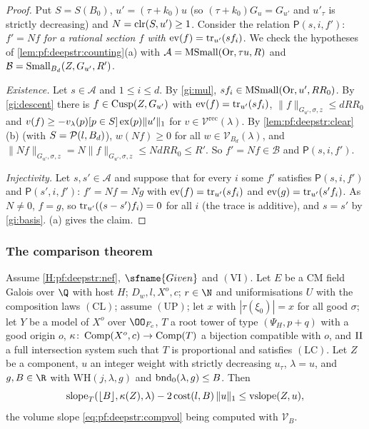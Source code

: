 \begin{proof}
Put $S=S(B_0)$, $u'=(\tau+k_0)u$ (so $(\tau+k_0)G_u=G_{u'}$ and $u'_\tau$ is strictly decreasing) and
$N=\operatorname{clr}(S,u')\ge1$. Consider the relation $\mathsf P(s,i,f')$: \emph{$f'=Nf$ for a rational section
$f$ with $\operatorname{ev}(f)=\operatorname{tr}_{u'}(sf_i)$}. We check the hypotheses of \cref{lem:pf:deepstr:counting}(a)
with $\mathcal A=\operatorname{MSmall}(\mathrm{Or},\tau u,R)$ and $\mathcal B=\operatorname{Small}_{B_d}(Z,G_{u'},R')$.

\emph{Existence.} Let $s\in\mathcal A$ and $1\le i\le d$. By \ref{gi:mul}, $sf_i\in\operatorname{MSmall}(\mathrm{Or},u',RR_0)$. By
\ref{gi:descent} there is $f\in\operatorname{Cusp}(Z,G_{u'})$ with $\operatorname{ev}(f)=\operatorname{tr}_{u'}(sf_i)$,
$\|f\|_{G_{u'},\sigma,z}\le dRR_0$ and $v(f)\ge-v_\lambda(p)[p\in S]\operatorname{ex}(p)\|u'\|_1$ for $v\in\mathcal
V^{\mathrm{rec}}(\lambda)$. By \cref{lem:pf:deepstr:clear}(b) (with $S=\mathcal{P}(l,B_d)$), $w(Nf)\ge0$ for all
$w\in\mathcal V_{B_d}(\lambda)$, and $\|Nf\|_{G_{u'},\sigma,z}=N\|f\|_{G_{u'},\sigma,z}\le NdRR_0\le R'$. So
$f'=Nf\in\mathcal B$ and $\mathsf P(s,i,f')$.

\emph{Injectivity.} Let $s,s'\in\mathcal A$ and suppose that for every $i$ some $f'$ satisfies $\mathsf P(s,i,f')$
and $\mathsf P(s',i,f')$: $f'=Nf=Ng$ with $\operatorname{ev}(f)=\operatorname{tr}_{u'}(sf_i)$ and $\operatorname{ev}(g)=\operatorname{tr}_{u'}(s'f_i)$.
As $N\ne0$, $f=g$, so $\operatorname{tr}_{u'}((s-s')f_i)=0$ for all $i$ (the trace is additive), and $s=s'$ by
\ref{gi:basis}. (a) gives the claim.
\end{proof}

\subsubsection*{The comparison theorem}

\begin{theorem}\label{thm:pf:deepstr:comparison}
Assume \ref{H:pf:deepstr:nef}, $\sfname{Given}$ and $\mathrm{(VI)}$. Let $E$ be a CM field Galois over $\Q$ with
host $H$; $D_w,l,X^o,c$; $r\in\N$ and uniformisations $U$ with the composition laws $\mathrm{(CL)}$; assume $\mathrm{(UP)}$;
let $x$ with $|\tau(\xi_0)|=x$ for all good $\sigma$; let $Y$ be a model of $X^o$ over $\OO_{F_c}$, $T$ a root tower of
type $(\Psi_H,p+q)$ with a good origin $o$, $\kappa\colon\operatorname{Comp}(X^o,c)\to\operatorname{Comp}(T)$ a bijection compatible
with $o$, and $\mathrm{II}$ a full intersection system such that $T$ is proportional and satisfies
$\mathrm{(LC)}$. Let $Z$ be a component, $u$ an integer weight with strictly decreasing $u_\tau$, $\lambda=u$,
and $g,B\in\R$ with $\mathrm{WH}(j,\lambda,g)$ and $\operatorname{bnd}_0(\lambda,g)\le B$. Then
\[
\operatorname{slope}_T(\lfloor B\rfloor,\kappa(Z),\lambda)-2\operatorname{cost}(l,B)\,\|u\|_1\le\operatorname{vslope}(Z,u),
\]
the volume slope \eqref{eq:pf:deepstr:compvol} being computed with $\mathcal V_B$.
\end{theorem}

